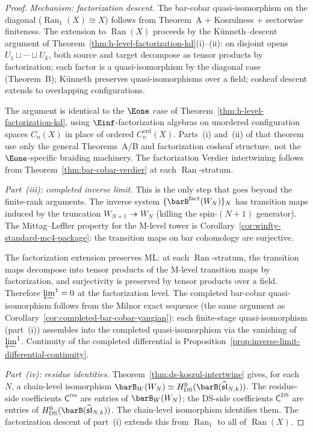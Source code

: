 \begin{proof}
\emph{Mechanism: factorization descent.}
The bar-cobar quasi-isomorphism on the diagonal
($\operatorname{Ran}_1(X) \cong X$) follows from Theorem~A +
Koszulness + sectorwise finiteness.  The extension to
$\operatorname{Ran}(X)$ proceeds by the
K\"unneth--descent argument of
Theorem~\ref{thm:h-level-factorization-kd}(i)--(ii): on
disjoint opens $U_1 \sqcup \cdots \sqcup U_k$, both source and
target decompose as tensor products by factorization; each factor
is a quasi-isomorphism by the diagonal case (Theorem~B);
K\"unneth preserves quasi-isomorphisms over a field; cosheaf
descent extends to overlapping configurations.

The argument is identical to the $\Eone$ case of
Theorem~\ref{thm:h-level-factorization-kd}, using
$\Einf$-factorization algebras on unordered configuration
spaces $C_n(X)$ in place of ordered $C_n^{\mathrm{ord}}(X)$.
Parts~(i) and~(ii) of that theorem use only the general
Theorems~A/B and factorization cosheaf structure, not the
$\Eone$-specific braiding machinery.
The factorization Verdier intertwining follows from
Theorem~\ref{thm:bar-cobar-verdier} at each
$\operatorname{Ran}$-stratum.

\emph{Part~(iii): completed inverse limit.}
This is the only step that goes beyond the finite-rank arguments.
The inverse system $\{\barB^{\mathrm{fact}}(W_N)\}_{N}$ has
transition maps induced by the truncation
$W_{N+1} \twoheadrightarrow W_N$ (killing the spin-$(N{+}1)$
generator).  The Mittag--Leffler property for the M-level tower
is Corollary~\ref{cor:winfty-standard-mc4-package}: the
transition maps on bar cohomology are surjective.

The factorization extension preserves ML: at each
$\operatorname{Ran}$-stratum, the transition maps decompose into
tensor products of the M-level transition maps by factorization,
and surjectivity is preserved by tensor products over a field.
Therefore $\varprojlim^1 = 0$ at the factorization level.
The completed bar-cobar quasi-isomorphism follows from the
Milnor exact sequence
(the same argument as
Corollary~\ref{cor:completed-bar-cobar-yangian}):
each finite-stage quasi-isomorphism (part~(i)) assembles into
the completed quasi-isomorphism via the vanishing of
$\varprojlim^1$.  Continuity of the completed differential is
Proposition~\ref{prop:inverse-limit-differential-continuity}.

\emph{Part~(iv): residue identities.}
Theorem~\ref{thm:ds-koszul-intertwine} gives, for each~$N$,
a chain-level isomorphism
$\barB_W(W_N) \simeq H^0_{\mathrm{DS}}(\barB(
\widehat{\mathfrak{sl}}_{N,k}))$.
The residue-side coefficients $\mathsf{C}^{\mathrm{res}}$ are
entries of $\barB_W(W_N)$; the DS-side coefficients
$\mathsf{C}^{\mathrm{DS}}$ are entries of
$H^0_{\mathrm{DS}}(\barB(\widehat{\mathfrak{sl}}_{N,k}))$.
The chain-level isomorphism identifies them.
The factorization descent of part~(i) extends this from
$\operatorname{Ran}_1$ to all of $\operatorname{Ran}(X)$.


\end{proof}
